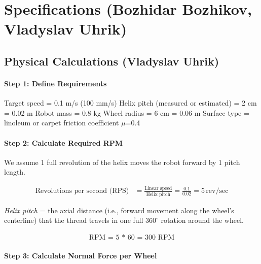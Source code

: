 \documentclass[12pt,a4paper,english]{article}
\begin{document}
%

\section{Specifications (Bozhidar Bozhikov, Vladyslav Uhrik)}

\subsection{Physical Calculations (Vladyslav Uhrik)}

\paragraph{Step 1: Define Requirements}
Target speed = 0.1 m/s (100 mm/s)
Helix pitch (measured or estimated) = 2 cm = 0.02 m
Robot mass = 0.8 kg
Wheel radius = 6 cm = 0.06 m
Surface type = linoleum or carpet friction coefficient $\mu$=0.4

\paragraph{Step 2: Calculate Required RPM}

We assume 1 full revolution of the helix moves the robot forward by 1 pitch length.

\begin{align*}
    \text{Revolutions per second (RPS)} &= \frac{\text{Linear speed}}{\text{Helix pitch}} = \frac{0.1}{0.02} = 5 \, \text{rev/sec}
\end{align*}

\textit{Helix pitch} = the axial distance (i.e., forward movement along the wheel's centerline) that the thread travels in one full \( 360^\circ \) rotation around the wheel.

\begin{align*}
	\text{RPM = 5 * 60 = 300 RPM}
\end{align*}

\paragraph{Step 3: Calculate Normal Force per Wheel}
\end{document}
